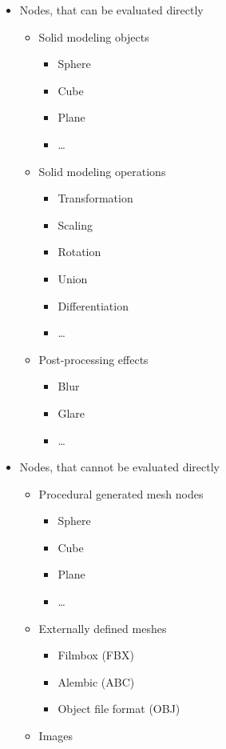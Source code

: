 \documentclass[10pt, openright, notitlepage]{scrreprt}
\begin{document}
\begin{itemize}
\item Nodes, that can be evaluated directly
\begin{itemize}
\item Solid modeling objects
\begin{itemize}
\item Sphere
\item Cube
\item Plane
\item \ldots{}
\end{itemize}
\item Solid modeling operations
\begin{itemize}
\item Transformation
\item Scaling
\item Rotation
\item Union
\item Differentiation
\item \ldots{}
\end{itemize}
\item Post-processing effects
\begin{itemize}
\item Blur
\item Glare
\item \ldots{}
\end{itemize}
\end{itemize}
\item Nodes, that cannot be evaluated directly
\begin{itemize}
\item Procedural generated mesh nodes
\begin{itemize}
\item Sphere
\item Cube
\item Plane
\item \ldots{}
\end{itemize}
\item Externally defined meshes
\begin{itemize}
\item Filmbox (FBX)
\item Alembic (ABC)
\item Object file format (OBJ)
\end{itemize}
\item Images
\end{itemize}
\end{itemize}
\end{document}
